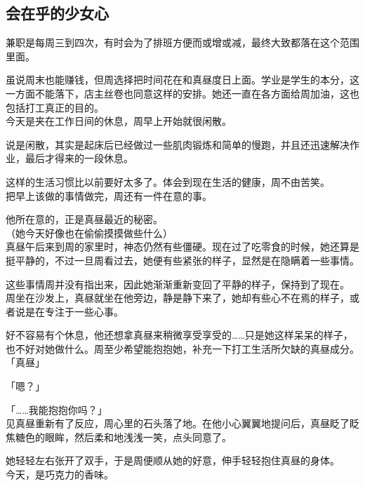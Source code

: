 \subsection{会在乎的少女心}

兼职是每周三到四次，有时会为了排班方便而或增或减，最终大致都落在这个范围里面。

虽说周末也能赚钱，但周选择把时间花在和真昼度日上面。学业是学生的本分，这一方面不能落下，店主丝卷也同意这样的安排。她还一直在各方面给周加油，这也包括打工真正的目的。\\

今天是夹在工作日间的休息，周早上开始就很闲散。

说是闲散，其实是起床后已经做过一些肌肉锻炼和简单的慢跑，并且还迅速解决作业，最后才得来的一段休息。

这样的生活习惯比以前要好太多了。体会到现在生活的健康，周不由苦笑。\\

把早上该做的事情做完，周还有一件在意的事。

他所在意的，正是真昼最近的秘密。\\

（她今天好像也在偷偷摸摸做些什么）\\

真昼午后来到周的家里时，神态仍然有些僵硬。现在过了吃零食的时候，她还算是挺平静的，不过一旦周看过去，她便有些紧张的样子，显然是在隐瞒着一些事情。

这些事情周并没有指出来，因此她渐渐重新变回了平静的样子，保持到了现在。\\

周坐在沙发上，真昼就坐在他旁边，静是静下来了，她却有些心不在焉的样子，或者说是在专注于一些心事。

好不容易有个休息，他还想拿真昼来稍微享受享受的……只是她这样呆呆的样子，也不好对她做什么。周至少希望能抱抱她，补充一下打工生活所欠缺的真昼成分。\\

「真昼」

「嗯？」

「……我能抱抱你吗？」\\

见真昼重新有了反应，周心里的石头落了地。在他小心翼翼地提问后，真昼眨了眨焦糖色的眼眸，然后柔和地浅浅一笑，点头同意了。

她轻轻左右张开了双手，于是周便顺从她的好意，伸手轻轻抱住真昼的身体。\\

今天，是巧克力的香味。\\

